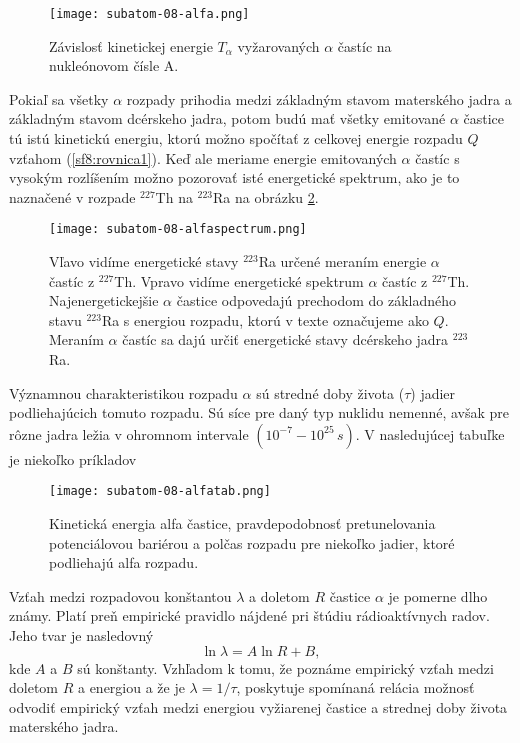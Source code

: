 \documentclass[../../main.tex]{subfiles}
\begin{document}
\begin{figure}[!h]
\texttt{[image: subatom-08-alfa.png]}
\centering
\caption{Závislosť kinetickej energie $T_{\alpha}$ vyžarovaných $\alpha$ častíc na nukleónovom čísle A.}
\label{sf8:fig:alfa}
\end{figure}

Pokiaľ sa všetky $\alpha$ rozpady prihodia medzi základným stavom materského jadra a základným stavom dcérskeho jadra, potom budú mať všetky emitované $\alpha$ častice tú istú kinetickú energiu, ktorú možno spočítať z celkovej energie rozpadu $Q$ vzťahom (\ref{sf8:rovnica1}). Keď ale meriame energie emitovaných $\alpha$ častíc s vysokým rozlíšením možno pozorovať isté energetické spektrum, ako je to naznačené v rozpade $^{227}$Th na $^{223}$Ra na obrázku \ref{sf8:fig:alfaspectrum}.

\begin{figure}[!h]
\texttt{[image: subatom-08-alfaspectrum.png]}
\centering
\caption{Vľavo vidíme energetické stavy $^{223}$Ra určené meraním energie $\alpha$ častíc z $^{227}$Th. Vpravo vidíme energetické spektrum $\alpha$ častíc z $^{227}$Th. Najenergetickejšie $\alpha$ častice odpovedajú prechodom do základného stavu $^{223}$Ra s energiou rozpadu, ktorú v texte označujeme ako $Q$. Meraním $\alpha$ častíc sa dajú určiť energetické stavy dcérskeho jadra $^{223}$Ra.}
\label{sf8:fig:alfaspectrum}
\end{figure}

Významnou charakteristikou rozpadu $\alpha$ sú stredné doby života ($\tau$) jadier podliehajúcich tomuto rozpadu. Sú síce pre daný typ nuklidu nemenné, avšak pre rôzne jadra ležia v ohromnom intervale $(10^{-7}-10^{25}\,\unit{s})$. V nasledujúcej tabuľke je niekoľko príkladov

\begin{figure}[!h]
\texttt{[image: subatom-08-alfatab.png]}
\centering
\caption{Kinetická energia alfa častice, pravdepodobnosť pretunelovania potenciálovou bariérou a polčas rozpadu pre niekoľko jadier, ktoré podliehajú alfa rozpadu.}
\label{sf8:fig:alfatab}
\end{figure}

Vzťah medzi rozpadovou konštantou $\lambda$ a doletom $R$ častice $\alpha$ je pomerne dlho známy. Platí preň empirické pravidlo nájdené pri štúdiu rádioaktívnych radov. Jeho tvar je nasledovný
$$ \ln \lambda = A \ln R + B, $$
kde $A$ a $B$ sú konštanty. Vzhľadom k tomu, že poznáme empirický vzťah medzi doletom $R$ a energiou a že je $\lambda = 1 / \tau$, poskytuje spomínaná relácia možnosť odvodiť empirický vzťah medzi energiou vyžiarenej častice a strednej doby života materského jadra.
\end{document}
